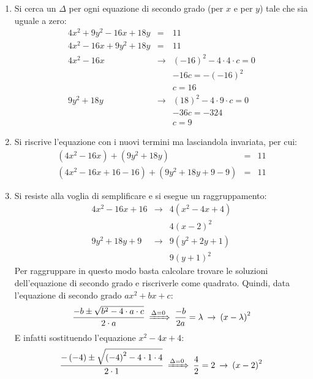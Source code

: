 \documentclass[a4paper]{article}
\begin{document}
	\begin{enumerate}[label=\alph*.]
		\item Si cerca un $\Delta$ per ogni equazione di secondo grado (per $x$ e per $y$) tale che sia uguale a zero:
		\begin{equation*}
			\begin{array}{rcl}
				4x^{2} + 9y^{2} - 16x + 18y &=& 11 \\ [.3em]
				4x^{2} - 16x + 9y^{2} + 18y &=& 11 \\ [1em]
				4x^{2} - 16x &\rightarrow& \left(-16\right)^{2} - 4 \cdot 4 \cdot c = 0 \\ [.3em]
				&& -16c = -\left(-16\right)^{2} \\ [.3em]
				&& c = 16 \\ [1em]
				9y^{2} + 18y &\rightarrow& \left(18\right)^{2} - 4 \cdot 9 \cdot c = 0 \\ [.3em]
				&& -36c = -324 \\ [.3em]
				&& c = 9
			\end{array}
		\end{equation*}

		\item Si riscrive l'equazione con i nuovi termini ma lasciandola invariata, per cui:
		\begin{equation*}
			\begin{array}{rcl}
				\left(4x^{2} - 16x\right) + \left(9y^{2} + 18y\right) &=& 11 \\ [.3em]
				\left(4x^{2} - 16x + 16 - 16\right) + \left(9y^{2} + 18y + 9 - 9\right) &=& 11
			\end{array}
		\end{equation*}
		
		\item Si resiste alla voglia di semplificare e si esegue un raggruppamento:
		\begin{equation*}
			\begin{array}{rcl}
				4x^{2} - 16x + 16 &\rightarrow& 4\left(x^{2} - 4x + 4\right) \\ [.3em]
											 && 4\left(x-2\right)^{2} \\ [1em]
				9y^{2} + 18y + 9  &\rightarrow& 9\left(y^{2} + 2y + 1\right) \\ [.3em]
											 && 9\left(y+1\right)^{2}
			\end{array}
		\end{equation*}
		Per raggruppare in questo modo basta calcolare trovare le soluzioni dell'equazione di secondo grado e riscriverle come quadrato. Quindi, data l'equazione di secondo grado $ax^{2}+bx+c$:
		\begin{equation*}
			\dfrac{-b \pm \sqrt{b^{2} - 4 \cdot a \cdot c}}{2 \cdot a} \: \xRightarrow{\Delta = 0} \: \dfrac{-b}{2a} = \lambda \: \rightarrow \: \left(x-\lambda\right)^{2}
		\end{equation*}
		E infatti sostituendo l'equazione $x^{2} - 4x + 4$:
		\begin{equation*}
			\dfrac{-\left(-4\right) \pm \sqrt{\left(-4\right)^{2} - 4 \cdot 1 \cdot 4}}{2 \cdot 1} \: \xRightarrow{\Delta = 0} \: \dfrac{4}{2} = 2 \: \rightarrow \: \left(x-2\right)^{2}
		\end{equation*}


\end{enumerate}
\end{document}
